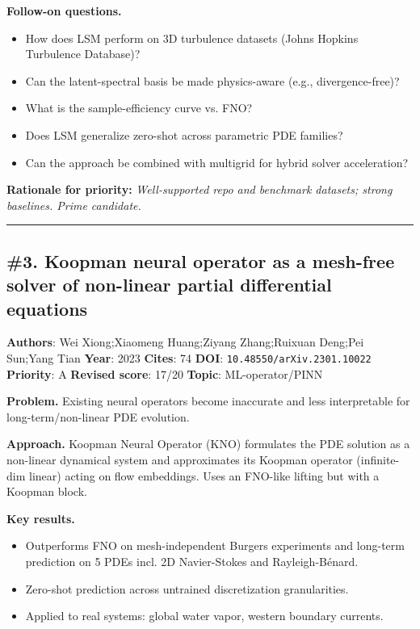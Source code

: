 \documentclass[10pt,letterpaper]{article}
\begin{document}
\textbf{Follow-on questions.}
\begin{itemize}
\item How does LSM perform on 3D turbulence datasets (Johns Hopkins Turbulence Database)?
\item Can the latent-spectral basis be made physics-aware (e.g., divergence-free)?
\item What is the sample-efficiency curve vs. FNO?
\item Does LSM generalize zero-shot across parametric PDE families?
\item Can the approach be combined with multigrid for hybrid solver acceleration?
\end{itemize}

\textbf{Rationale for priority:} \emph{Well-supported repo and benchmark datasets; strong baselines. Prime candidate.}

\medskip\hrule\medskip

\subsection*{\#3. Koopman neural operator as a mesh-free solver of non-linear partial differential equations}
\textbf{Authors}: Wei Xiong;Xiaomeng Huang;Ziyang Zhang;Ruixuan Deng;Pei Sun;Yang Tian \textbullet{} \textbf{Year}: 2023 \textbullet{} \textbf{Cites}: 74 \textbullet{} \textbf{DOI}: \texttt{10.48550/arXiv.2301.10022} \\
\textbf{Priority}: A \textbullet{} \textbf{Revised score}: 17/20 \textbullet{} \textbf{Topic}: ML-operator/PINN

\textbf{Problem.} Existing neural operators become inaccurate and less interpretable for long-term/non-linear PDE evolution.

\textbf{Approach.} Koopman Neural Operator (KNO) formulates the PDE solution as a non-linear dynamical system and approximates its Koopman operator (infinite-dim linear) acting on flow embeddings. Uses an FNO-like lifting but with a Koopman block.

\textbf{Key results.}
\begin{itemize}
\item Outperforms FNO on mesh-independent Burgers experiments and long-term prediction on 5 PDEs incl. 2D Navier-Stokes and Rayleigh-Bénard.
\item Zero-shot prediction across untrained discretization granularities.
\item Applied to real systems: global water vapor, western boundary currents.
\end{itemize}
\end{document}
